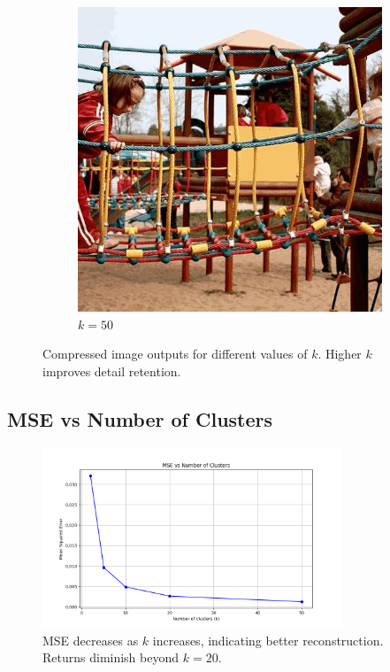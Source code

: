 \documentclass{article}
\begin{document}
\begin{figure}[H]
\begin{adjustwidth}{2cm}{}
    \vspace{1em}
    
    \begin{subfigure}[b]{0.40\textwidth}
        \includegraphics[width=\textwidth]{image_clustered_50.jpg}
        \caption{\(k=50\)}
    \end{subfigure}

    \caption{Compressed image outputs for different values of \(k\). Higher \(k\) improves detail retention.}
    \label{fig:images}
\end{adjustwidth}
\end{figure}

\subsection{MSE vs Number of Clusters}
\begin{figure}[H]
\begin{adjustwidth}{1.5cm}{}
    \centering
    \includegraphics[width=0.8\textwidth]{mse_vs_k.png}
    \caption{MSE decreases as \(k\) increases, indicating better reconstruction. Returns diminish beyond \(k = 20\).}
    \label{fig:mse}
\end{adjustwidth}
\end{figure}
\end{document}
